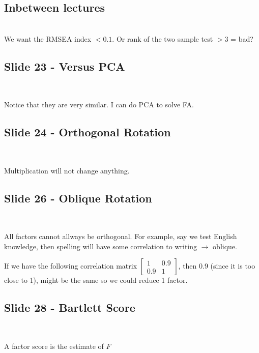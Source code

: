 \subsection{Inbetween lectures}\hfill\\
\noindent We want the RMSEA index $<0.1$. Or rank of the two sample test $>3$ = bad?
\par\bigskip
\subsection{Slide 23 - Versus PCA}\hfill\\\par
\noindent Notice that they are very similar. I can do PCA to solve FA.
\par\bigskip
\subsection{Slide 24 - Orthogonal Rotation}\hfill\\\par
\noindent Multiplication will not change anything.
\par\bigskip
\subsection{Slide 26 - Oblique Rotation}\hfill\\\par
\noindent All factors cannot allways be orthogonal. For example, say we test English knowledge, then spelling will have some correlation to writing $\rightarrow$ oblique.
\par\bigskip
\noindent If we have the following correlation matrix $\begin{bmatrix}1&0.9\\0.9&1\end{bmatrix}$, then 0.9 (since it is too close to 1), might be the same so we could reduce 1 factor.
\par\bigskip
\subsection{Slide 28 - Bartlett Score}\hfill\\\par
\noindent A factor score is the estimate of $F$
